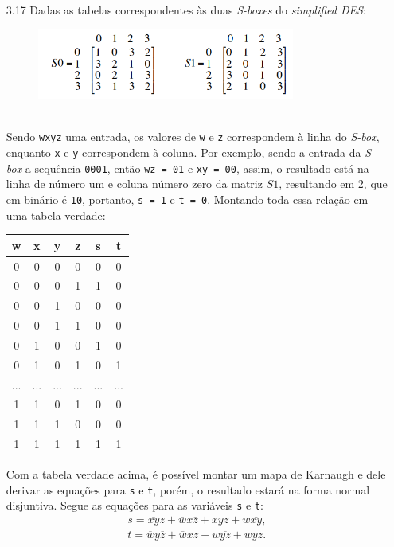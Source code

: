 \documentclass{article}
\begin{document}
\begin{enumerate}
    \item[3.17] Dadas as tabelas correspondentes às duas \textit{S-boxes} do
        \textit{simplified DES}: \\
    \begin{figure}[ht!]
        \includegraphics[width=0.8\textwidth]{imgs/s0_and_s1.png}
        \centering
        \label{fig:s0_and_s1}
    \end{figure} \\
    Sendo \texttt{wxyz} uma entrada, os valores de \texttt{w} e \texttt{z}
    correspondem à linha do \textit{S-box}, enquanto \texttt{x} e \texttt{y}
    correspondem à coluna. Por exemplo, sendo a entrada da \textit{S-box} a
    sequência \texttt{0001}, então \texttt{wz = 01} e \texttt{xy = 00}, assim,
    o resultado está na linha de número um e coluna número zero da matriz $S1$,
    resultando em 2, que em binário é \texttt{10}, portanto, \texttt{s = 1} e
    \texttt{t = 0}. Montando toda essa relação em uma tabela verdade: \\
    \begin{center}
        \begin{tabular}{c|c|c|c|c|c}
            w & x & y & z & s & t \\
            
            \hline
            0 & 0 & 0 & 0 & 0 & 0 \\
            0 & 0 & 0 & 1 & 1 & 0 \\
            0 & 0 & 1 & 0 & 0 & 0 \\
            0 & 0 & 1 & 1 & 0 & 0 \\
            0 & 1 & 0 & 0 & 1 & 0 \\
            0 & 1 & 0 & 1 & 0 & 1 \\
            ... & ... & ... & ... & ... & ... \\
            1 & 1 & 0 & 1 & 0 & 0 \\
            1 & 1 & 1 & 0 & 0 & 0 \\
            1 & 1 & 1 & 1 & 1 & 1 \\
        \end{tabular}
    \end{center}
    Com a tabela verdade acima, é possível montar um mapa de
    Karnaugh\cite{karnaugh1953} e dele derivar as equações para \texttt{s} e
    \texttt{t}, porém, o resultado estará na forma normal disjuntiva. Segue as
    equações para as variáveis \texttt{s} e \texttt{t}:
    \begin{gather*}
        s = \overline{xy}z + \overline{w}x\overline{z} + xyz + w\overline{xy}, \\
        t = \overline{w}y\overline{z} + \overline{w}xz + w\overline{yz} + wyz.
    \end{gather*}


\end{enumerate}
\end{document}

